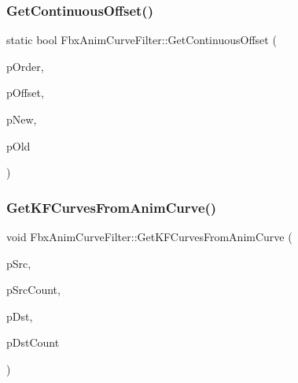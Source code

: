 \mbox{\label{class_fbx_anim_curve_filter_a6aa65cd224b35635b02d842b2c72692e}} 
\subsubsection{\texorpdfstring{Get\+Continuous\+Offset()}{GetContinuousOffset()}}
{\footnotesize\ttfamily static bool Fbx\+Anim\+Curve\+Filter\+::\+Get\+Continuous\+Offset (\begin{DoxyParamCaption}\item[{\hyperlink{class_fbx_rotation_order}{Fbx\+Rotation\+Order} \&}]{p\+Order,  }\item[{\hyperlink{class_fbx_vector4}{Fbx\+Vector4} \&}]{p\+Offset,  }\item[{\hyperlink{class_fbx_vector4}{Fbx\+Vector4} \&}]{p\+New,  }\item[{\hyperlink{class_fbx_vector4}{Fbx\+Vector4} \&}]{p\+Old }\end{DoxyParamCaption})\hspace{0.3cm}{\ttfamily [static]}}

\mbox{\label{class_fbx_anim_curve_filter_aa5aafb34a738b03619cdf426eb9b4089}} 
\subsubsection{\texorpdfstring{Get\+K\+F\+Curves\+From\+Anim\+Curve()}{GetKFCurvesFromAnimCurve()}}
{\footnotesize\ttfamily void Fbx\+Anim\+Curve\+Filter\+::\+Get\+K\+F\+Curves\+From\+Anim\+Curve (\begin{DoxyParamCaption}\item[{\hyperlink{class_fbx_anim_curve}{Fbx\+Anim\+Curve} $\ast$$\ast$}]{p\+Src,  }\item[{int}]{p\+Src\+Count,  }\item[{K\+F\+Curve $\ast$$\ast$}]{p\+Dst,  }\item[{int \&}]{p\+Dst\+Count }\end{DoxyParamCaption})\hspace{0.3cm}{\ttfamily [protected]}}

